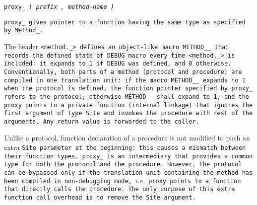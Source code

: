 
\tt{proxy_ (} \it{prefix} \tt{,} \it{method-name} \tt{)}


\tt{proxy_} gives pointer to a function having
the same type as specified by \tt{Method_}.

The header \tt{<method._>} defines an object-like macro \tt{METHOD__} that
records the \tt{defined} state of \tt{DEBUG} macro every time \tt{<method._>} is
included: it expands to \tt{1} if \tt{DEBUG} was defined, and \tt{0} otherwise.
Conventionally, both parts of a method (protocol and procedure) are compiled in one
translation unit: if the macro \tt{METHOD__} expands to \tt{1} when the protocol
is defined, the function pointer specified by \tt{proxy_} refers to the protocol;
otherwise \tt{METHOD__} shall expand to \tt{1}, and the proxy points to a
\tt{private} function (internal linkage) that ignores the first argument
of type \tt{Site} and invokes the procedure with rest of the arguments.
Any return value is forwarded to the caller.

\note Unlike a protocol, function declaration of a procedure is not
modified to push an extra \tt{Site} parameter at the beginning:
this causes a mismatch between their function types.
\tt{proxy_} is an intermediary that provides a
common type for both the protocol and the procedure.
However, the protocol can be bypassed only if the translation
unit containing the method has been compiled in non-debugging mode,
$i.e.$ proxy points to a function that directly calls the procedure.
The only purpose of this extra function call
overhead is to remove the \tt{Site} argument.
